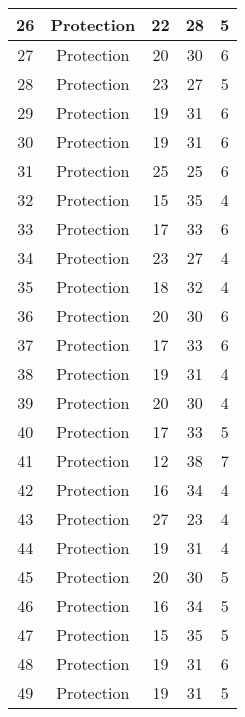 \documentclass[results.tex]{subfiles}
\begin{document}
\begin{center}
\begin{tabular}{| c || c | c | c | c |}
    \hline
    26 & Protection & 22 & 28 & 5 \\ 
    \hline
    27 & Protection & 20 & 30 & 6 \\ 
    \hline
    28 & Protection & 23 & 27 & 5 \\ 
    \hline
    29 & Protection & 19 & 31 & 6 \\ 
    \hline
    30 & Protection & 19 & 31 & 6 \\ 
    \hline
    31 & Protection & 25 & 25 & 6 \\ 
    \hline
    32 & Protection & 15 & 35 & 4 \\ 
    \hline
    33 & Protection & 17 & 33 & 6 \\ 
    \hline
    34 & Protection & 23 & 27 & 4 \\ 
    \hline
    35 & Protection & 18 & 32 & 4 \\ 
    \hline
    36 & Protection & 20 & 30 & 6 \\ 
    \hline
    37 & Protection & 17 & 33 & 6 \\ 
    \hline
    38 & Protection & 19 & 31 & 4 \\ 
    \hline
    39 & Protection & 20 & 30 & 4 \\ 
    \hline
    40 & Protection & 17 & 33 & 5 \\ 
    \hline
    41 & Protection & 12 & 38 & 7 \\ 
    \hline
    42 & Protection & 16 & 34 & 4 \\ 
    \hline
    43 & Protection & 27 & 23 & 4 \\ 
    \hline
    44 & Protection & 19 & 31 & 4 \\ 
    \hline
    45 & Protection & 20 & 30 & 5 \\ 
    \hline
    46 & Protection & 16 & 34 & 5 \\ 
    \hline
    47 & Protection & 15 & 35 & 5 \\ 
    \hline
    48 & Protection & 19 & 31 & 6 \\ 
    \hline
    49 & Protection & 19 & 31 & 5 \\ 
    \hline   \end{tabular}
\end{center}
\end{document}

